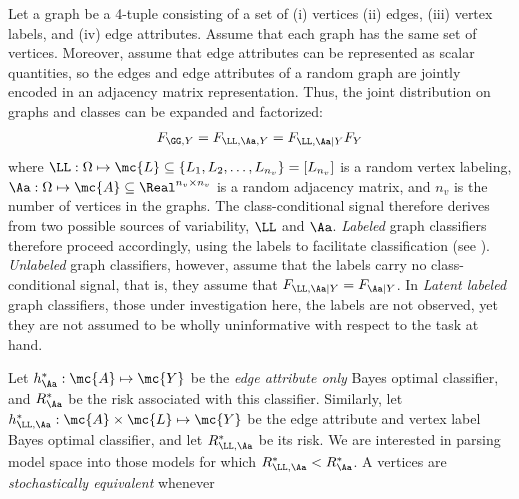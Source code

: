 \documentclass[10pt,journal,cspaper,compsoc]{IEEEtran}
\begin{document}
Let a graph be a 4-tuple consisting of a set of (i) vertices  (ii) edges, (iii) vertex labels, and (iv)  edge attributes. %
Assume that each graph has the same set of vertices.  Moreover, assume that edge attributes can be represented as scalar quantities, so the edges and edge attributes of a random graph are jointly encoded in an adjacency matrix representation.  Thus, the joint distribution on graphs and classes can be expanded and factorized:
\begin{align} \label{eq:gc}
	F_{\GG,Y}=F_{\LL,\Aa,Y}=F_{\LL,\Aa | Y} F_{Y}
\end{align}
where $\LL: \Omega \mapsto \mc{L} \subseteq \{L_1,L_2,\ldots,L_{n_v}\}=[L_{n_v}]$ is a random vertex labeling,  $\Aa: \Omega \mapsto \mc{A} \subseteq \Real^{n_v \times n_v}$ is a random adjacency matrix, and $n_v$ is the number of vertices in the graphs.  The class-conditional signal therefore derives from two possible sources of variability, $\LL$ and $\Aa$.  \emph{Labeled} graph classifiers therefore proceed accordingly, using the labels to facilitate classification (see \cite{Vogelstein2011}). \emph{Unlabeled} graph classifiers, however, assume that the labels carry no class-conditional signal, that is, they assume that $F_{\LL,\Aa | Y}=F_{\Aa | Y}$. In \emph{Latent labeled} graph classifiers, those under investigation here, the labels are not observed, yet they are not assumed to be wholly uninformative with respect to the task at hand.  


Let $h_{\Aa}^*: \mc{A} \mapsto \mc{Y}$ be the \emph{edge attribute only} Bayes optimal classifier, and $R_{\Aa}^*$ be the risk associated with this classifier.  Similarly, let $h_{\LL,\Aa}^*: \mc{A} \times \mc{L} \mapsto \mc{Y}$ be the edge attribute and vertex label Bayes optimal classifier, and let $R_{\LL,\Aa}^*$ be its risk.  We are interested in parsing model space into those models for which $R_{\LL,\Aa}^* < R_{\Aa}^*$.  A vertices are \emph{stochastically equivalent} whenever
\end{document}
